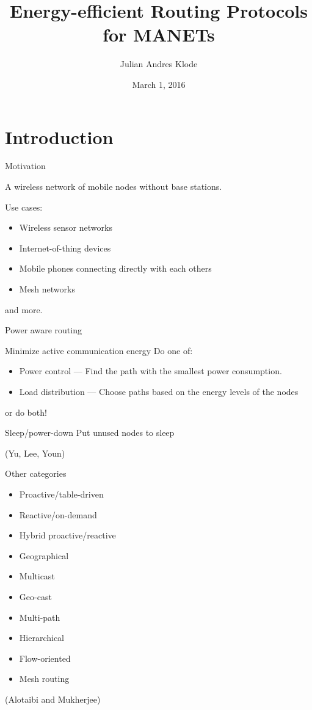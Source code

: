\documentclass{beamer}
\title{Energy-efficient Routing Protocols for MANETs}
\author{Julian Andres Klode}
\date{March 1, 2016}
\begin{document}
\maketitle


\section{Introduction}
\frame{\tableofcontents[currentsection]}
\begin{frame}{Motivation}
\begin{Definition}
    A wireless network of mobile nodes without base stations.
  \end{Definition}
  Use cases:

  \begin{itemize}
      \item Wireless sensor networks
      \item Internet-of-thing devices
      \item Mobile phones connecting directly with each others
      \item Mesh networks
  \end{itemize}

  and more.
\end{frame}


\begin{frame}{Power aware routing}
\begin{block}{Minimize active communication energy}
    Do one of:
    \begin{itemize}
        \item Power control --- Find the path with the smallest power consumption.
        \item Load distribution --- Choose paths based on the energy levels of the nodes
    \end{itemize}
    or do both!
\end{block}
\begin{block}{Sleep/power-down}
    Put unused nodes to sleep
\end{block}
(Yu, Lee, Youn\cite{main1})
\end{frame}
\begin{frame}{Other categories}
\begin{itemize}
    \item Proactive/table-driven
    \item Reactive/on-demand
    \item Hybrid proactive/reactive
    \item Geographical
    \item Multicast
    \item Geo-cast
    \item Multi-path
    \item Hierarchical
    \item Flow-oriented
    \item Mesh routing
\end{itemize}
    (Alotaibi and Mukherjee\cite{alotaibi2012survey})
\end{frame}
\end{document}

